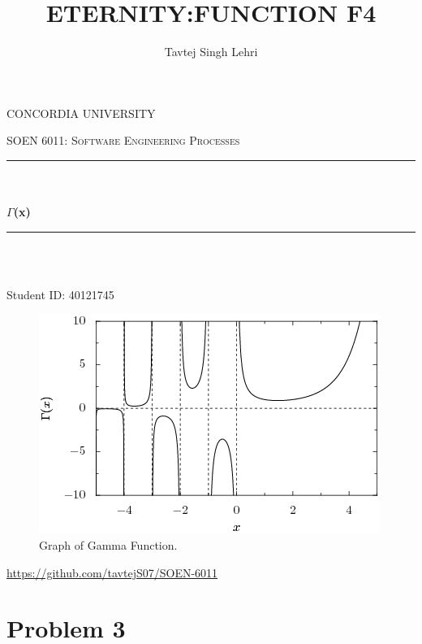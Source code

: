\documentclass[12pt]{report}
\title{ETERNITY:FUNCTION F4}
\author{Tavtej Singh Lehri}
\date{}
\makeatletter
\let\thetitle\@title
\let\theauthor\@author
\makeatother
\begin{document}
\begin{titlepage}
\centering
\vspace*{0.5 cm}

\begin{center}
\textsc{\Large CONCORDIA UNIVERSITY}\\ [2.0 cm]    
\end{center}

\textsc{\large SOEN 6011: Software Engineering Processes}\\[0.5 cm]
\rule{\linewidth}{0.2 mm}\\[0.4 cm]
{\LARGE \textbf \thetitle}\\[0.2 cm]
{\LARGE \textbf{$\Gamma$(x)}}
\rule{\linewidth}{0.2 mm}\\[1.5 cm]

\begin{center}
    {\Large \textbf{\theauthor}}\\[0.2 cm]
    {\large Student ID: 40121745}\\[2.0 cm]
    
    \begin{figure}[h!]
    \begin{center}
    \includegraphics[width=0.5\linewidth]{Gamma_function.png}
    \end{center}
    \caption{Graph of Gamma Function.\cite{gamma}}
    \end{figure}
    
    {\large \url{https://github.com/tavtejS07/SOEN-6011}}
\end{center}

\end{titlepage}

\tableofcontents
\pagebreak

\renewcommand{\thesection}{\arabic{section}}
\section{Problem 3}
\end{document}
